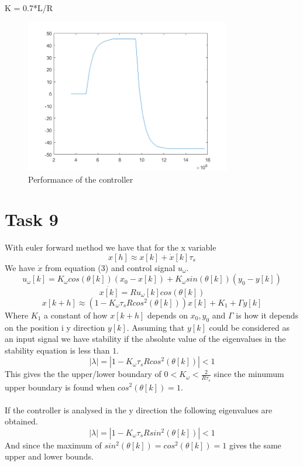 \documentclass[a4paper,12pt,oneside,onecolumn]{article} %
\begin{document}
K = 0.7*L/R
\begin{figure}[H]
\begin{center}	
  \includegraphics[width = 0.8\textwidth]{task8.png}
  \caption{Performance of the controller}
  
 \end{center}
\end{figure}
\section*{Task 9}
With euler forward method we have that for the x variable
\begin{equation*}
x[h]\approx x[k]+\dot{x}[k]\tau_s
\end{equation*}
We have $\dot{x}$ from equation (3) and control signal $u_\omega$.
\begin{equation*}
u_\omega [k] = K_{\omega} cos(\theta [k])(x_0 - x[k])+K_{\omega}sin(\theta [k]) (y_0-y[k])
\end{equation*}
\begin{equation*}
\dot{x[k]} = R u_\omega [k] cos(\theta[k])
\end{equation*}
\begin{equation*}
x[k+h]\approx  (1-K_\omega\tau_sRcos^2(\theta[k]))x[k]+K_1+\Gamma y[k]
\end{equation*}
Where $K_1$ a constant of how $x[k+h]$ depends on $x_0, y_0$ and $\Gamma$ is how it depends on the position i y direction $y[k]$. Assuming that $y[k]$ could be considered as an input signal we have stability if the absolute value of the eigenvalues in the stability equation is less than $1$.
\begin{equation*}
|\lambda |=|1-K_\omega\tau_sRcos^2(\theta[k])|<1
\end{equation*}
This gives the the upper/lower boundary of $0<K_\omega<\frac{2}{R\tau_s}$ since the minumum upper boundary is found when $cos^2(\theta[k])=1$.\\\\
If the controller is analysed in the y direction the following eigenvalues are obtained.
\begin{equation*}
|\lambda |=|1-K_\omega\tau_sRsin^2(\theta[k])|<1
\end{equation*} And since the maximum of $sin^2(\theta[k])=cos^2(\theta[k])=1$ gives the same upper and lower bounds.
\end{document}
